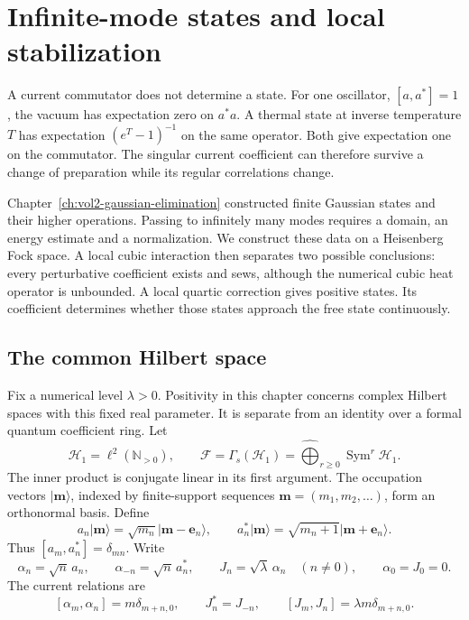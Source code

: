 \chapter{Infinite-mode states and local stabilization}
\label{ch:vol2-infinite-mode-states}

A current commutator does not determine a state. For one oscillator,
\([a,a^*]=1\), the vacuum has expectation zero on \(a^*a\).
A thermal state at inverse temperature \(T\) has expectation
\((e^T-1)^{-1}\) on the same operator. Both give expectation one
on the commutator. The singular current coefficient can therefore
survive a change of preparation while its regular correlations change.

Chapter~\ref{ch:vol2-gaussian-elimination} constructed finite Gaussian
states and their higher operations. Passing to infinitely many modes
requires a domain, an energy estimate and a normalization. We construct
these data on a Heisenberg Fock space. A local cubic interaction then
separates two possible conclusions: every perturbative coefficient
exists and sews, although the numerical cubic heat operator is unbounded.
A local quartic correction gives positive states. Its coefficient
determines whether those states approach the free state continuously.

\section{The common Hilbert space}

Fix a numerical level \(\lambda>0\). Positivity in this chapter
concerns complex Hilbert spaces with this fixed real parameter.
It is separate from an identity over a formal quantum coefficient ring.
Let
\[
 \mathcal H_1=\ell^2(\mathbb N_{>0}),\qquad
 \mathcal F=\Gamma_s(\mathcal H_1)
 =\widehat{\bigoplus}_{r\geq0}\operatorname{Sym}^r\mathcal H_1.
\]
The inner product is conjugate linear in its first argument.
The occupation vectors \(\lvert\mathbf m\rangle\), indexed by
finite-support sequences \(\mathbf m=(m_1,m_2,\ldots)\), form an
orthonormal basis. Define
\[
 a_n\lvert\mathbf m\rangle
 =\sqrt{m_n}\lvert\mathbf m-\mathbf e_n\rangle,\qquad
 a_n^*\lvert\mathbf m\rangle
 =\sqrt{m_n+1}\lvert\mathbf m+\mathbf e_n\rangle.
\]
Thus \([a_m,a_n^*]=\delta_{mn}\). Write
\[
 \alpha_n=\sqrt n\,a_n,\qquad
 \alpha_{-n}=\sqrt n\,a_n^*,\qquad
 J_n=\sqrt\lambda\,\alpha_n\quad(n\ne0),
 \qquad\alpha_0=J_0=0.
\]
The current relations are
\[
 [\alpha_m,\alpha_n]=m\delta_{m+n,0},\qquad
 J_n^*=J_{-n},\qquad
 [J_m,J_n]=\lambda m\delta_{m+n,0}.
\]


